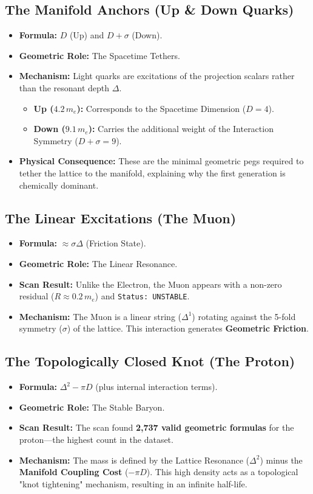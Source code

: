 \subsection*{The Manifold Anchors (Up \& Down Quarks)}
\begin{itemize}
    \item \textbf{Formula:} $D$ (Up) and $D+\sigma$ (Down).
    \item \textbf{Geometric Role:} The Spacetime Tethers.
    \item \textbf{Mechanism:} Light quarks are excitations of the projection scalars rather than the resonant depth $\Delta$.
    \begin{itemize}
        \item \textbf{Up ($4.2 \, m_e$):} Corresponds to the Spacetime Dimension ($D=4$).
        \item \textbf{Down ($9.1 \, m_e$):} Carries the additional weight of the Interaction Symmetry ($D+\sigma = 9$).
    \end{itemize}
    \item \textbf{Physical Consequence:} These are the minimal geometric pegs required to tether the lattice to the manifold, explaining why the first generation is chemically dominant.
\end{itemize}

\subsection*{The Linear Excitations (The Muon)}
\begin{itemize}
    \item \textbf{Formula:} $\approx \sigma \Delta$ (Friction State).
    \item \textbf{Geometric Role:} The Linear Resonance.
    \item \textbf{Scan Result:} Unlike the Electron, the Muon appears with a non-zero residual ($R \approx 0.2 \, m_e$) and \texttt{Status: UNSTABLE}.
    \item \textbf{Mechanism:} The Muon is a linear string ($\Delta^1$) rotating against the 5-fold symmetry ($\sigma$) of the lattice. This interaction generates \textbf{Geometric Friction}.
\end{itemize}

\subsection*{The Topologically Closed Knot (The Proton)}
\begin{itemize}
    \item \textbf{Formula:} $\Delta^2 - \pi D$ (plus internal interaction terms).
    \item \textbf{Geometric Role:} The Stable Baryon.
    \item \textbf{Scan Result:} The scan found \textbf{2,737 valid geometric formulas} for the proton—the highest count in the dataset.
    \item \textbf{Mechanism:} The mass is defined by the Lattice Resonance ($\Delta^2$) minus the \textbf{Manifold Coupling Cost} ($-\pi D$). This high density acts as a topological "knot tightening" mechanism, resulting in an infinite half-life.
\end{itemize}

